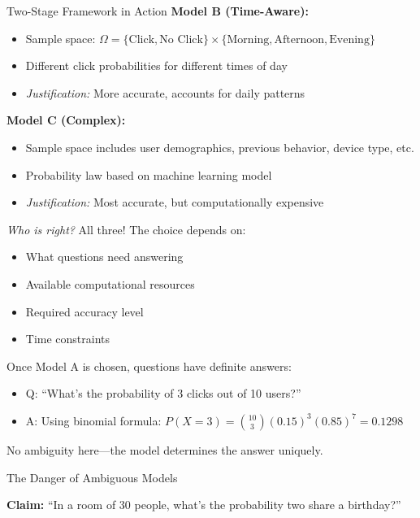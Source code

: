 \begin{itemize}
\begin{exampleboxbreak}{Two-Stage Framework in Action}
\textbf{Model B (Time-Aware):}
\begin{itemize}
    \item Sample space: $\Omega = \{\text{Click}, \text{No Click}\} \times \{\text{Morning}, \text{Afternoon}, \text{Evening}\}$
    \item Different click probabilities for different times of day
    \item \textit{Justification:} More accurate, accounts for daily patterns
\end{itemize}

\textbf{Model C (Complex):}
\begin{itemize}
    \item Sample space includes user demographics, previous behavior, device type, etc.
    \item Probability law based on machine learning model
    \item \textit{Justification:} Most accurate, but computationally expensive
\end{itemize}

\textit{Who is right?} All three! The choice depends on:
\begin{itemize}
    \item What questions need answering
    \item Available computational resources
    \item Required accuracy level
    \item Time constraints
\end{itemize}


Once Model A is chosen, questions have definite answers:
\begin{itemize}
    \item Q: ``What's the probability of 3 clicks out of 10 users?''
    \item A: Using binomial formula: $P(X=3) = \binom{10}{3}(0.15)^3(0.85)^7 = 0.1298$
\end{itemize}

No ambiguity here—the model determines the answer uniquely.

\end{exampleboxbreak}

\begin{exampleboxbreak}{The Danger of Ambiguous Models}


\textbf{Claim:} ``In a room of 30 people, what's the probability two share a birthday?''


\end{exampleboxbreak}
\end{itemize}
